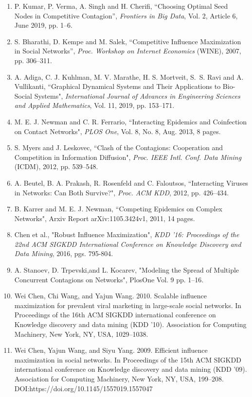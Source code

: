 \documentclass[11pt]{article}
\begin{document}
\begin{enumerate}
\item   P. Kumar, P. Verma, A. Singh and H. Cherifi,
``Choosing Optimal Seed Nodes in Competitive Contagion”, 
\emph{Frontiers in Big Data}, Vol. 2, Article 6, June 2019, pp. 1--6.

\item S. Bharathi, D. Kempe and M. Salek, ``Competitive Influence 
Maximization in Social Networks”, \emph{Proc. Workshop on Internet Economics}
(WINE), 2007, pp. 306--311.

\item A. Adiga, C. J. Kuhlman, M. V. Marathe, H. S. Mortveit, 
S.~S. Ravi and A. Vullikanti, ``Graphical Dynamical Systems and Their
Applications to Bio-Social Systems", \emph{International Journal of Advances
in Engineering Sciences and Applied Mathematics}, Vol. 11, 2019, pp. 153--171.

\item M. E. J. Newman and C. R. Ferrario, ``Interacting Epidemics and 
Coinfection on Contact Networks", \emph{PLOS One}, Vol. 8, No. 8, Aug. 2013,
8 pages.

\item S. Myers and J. Leskovec, ``Clash of the Contagions: Cooperation and 
Competition in Information Diffusion", \emph{Proc. IEEE Intl. Conf. Data Mining}
(ICDM), 2012, pp. 539--548.

\item A. Beutel, B. A. Prakash, R. Rosenfeld and C. Faloutsos,
``Interacting Viruses in Networks: Can Both Survive?", 
\emph{Proc. ACM KDD}, 2012, pp. 426--434.

\item B. Karrer and M. E. J. Newman, ``Competing Epidemics on Complex Networks",
Arxiv Report arXiv:1105.3424v1, 2011, 14 pages.

\item Chen et al., "Robust Influence Maximization", \emph{KDD '16: Proceedings of the 22nd ACM SIGKDD International Conference on Knowledge Discovery and Data Mining}, 2016, pgs. 795-804.

\item A. Stanoev, D. Trpevski,and L. Kocarev, "Modeling the Spread of Multiple Concurrent Contagions on Networks", PlosOne Vol. 9 pp. 1--16.
\item Wei Chen, Chi Wang, and Yajun Wang. 2010. Scalable influence maximization for prevalent viral marketing in large-scale social networks. In Proceedings of the 16th ACM SIGKDD international conference on Knowledge discovery and data mining (KDD ’10). Association for Computing Machinery, New York, NY, USA, 1029–1038. 

\item Wei Chen, Yajun Wang, and Siyu Yang. 2009. Efficient influence maximization in social networks. In Proceedings of the 15th ACM SIGKDD international conference on Knowledge discovery and data mining (KDD ’09). Association for Computing Machinery, New York, NY, USA, 199–208. DOI:https://doi.org/10.1145/1557019.1557047  

\end{enumerate}
\end{document}
